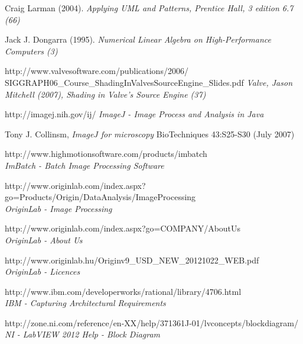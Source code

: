 \documentclass[a4paper,12pt,oneside]{report}
\begin{document}
\begin{thebibliography}{99}

		Craig Larman (2004). 
        {\em Applying UML and Patterns, Prentice Hall, 3 edition 6.7 (66)\\}

		Jack J. Dongarra (1995). 
        {\em Numerical Linear Algebra on High-Performance Computers (3)\\}
        
		http://www.valvesoftware.com/publications/2006/\\SIGGRAPH06\_Course\_ShadingInValvesSourceEngine\_Slides.pdf
        {\em Valve, Jason Mitchell (2007), Shading in Valve’s Source Engine  (37) \\}     
        
        

        http://imagej.nih.gov/ij/
        {\em ImageJ - Image Process and Analysis in Java}
        
		Tony J. Collinsm,
        {\em ImageJ for microscopy}
        BioTechniques 43:S25-S30 (July 2007)

        http://www.highmotionsoftware.com/products/imbatch\\
        {\em ImBatch - Batch Image Processing Software}

		http://www.originlab.com/index.aspx?go=Products/Origin/DataAnalysis/ImageProcessing\\
        {\em OriginLab - Image Processing}
        
        
        http://www.originlab.com/index.aspx?go=COMPANY/AboutUs\\
        {\em OriginLab - About Us}

		http://www.originlab.hu/Originv9\_USD\_NEW\_20121022\_WEB.pdf\\
        {\em OriginLab - Licences}
        
        http://www.ibm.com/developerworks/rational/library/4706.html\\
        {\em IBM - Capturing Architectural Requirements}  


		http://zone.ni.com/reference/en-XX/help/371361J-01/lvconcepts/blockdiagram/\\
        {\em NI - LabVIEW 2012 Help - Block Diagram}  


\end{thebibliography}
\end{document}
